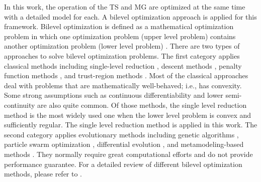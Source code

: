 In this work, the operation of the TS and MG are optimized at the same time with a detailed model for each. A bilevel optimization approach is applied for this framework. Bilevel optimization is defined as a mathematical optimization problem in which one optimization problem (upper level problem) contains another optimization problem (lower level problem) \cite{bilevel1}. There are two types of approaches to solve bilevel optimization problems. The first category applies classical methods including single-level reduction \cite{bialas1984two,bard1982explicit}, descent methods \cite{kolstad1990derivative,savard1994steepest}, penalty function methods \cite{lv2007penalty,white1993penalty}, and trust-region methods \cite{colson2005trust,marcotte2001trust}. Most of the classical approaches deal with problems that are mathematically well-behaved; i.e., has convexity. Some strong assumptions such as continuous differentiability and lower semi-continuity are also quite common. Of those methods, the single level reduction method is the most widely used one when the lower level problem is convex and sufficiently regular. The single level reduction method is applied in this work. The second category applies evolutionary methods including genetic algorithms \cite{mathieu1994genetic}, particle swarm optimization \cite{li2006hierarchical}, differential evolution \cite{zhu2006hybrid}, and metamodeling-based methods \cite{wang2007review}. They normally require great computational efforts and do not provide performance guarantee. For a detailed review of different bilevel optimization methods, please refer to \cite{bilevel1, bilevel2}. 


